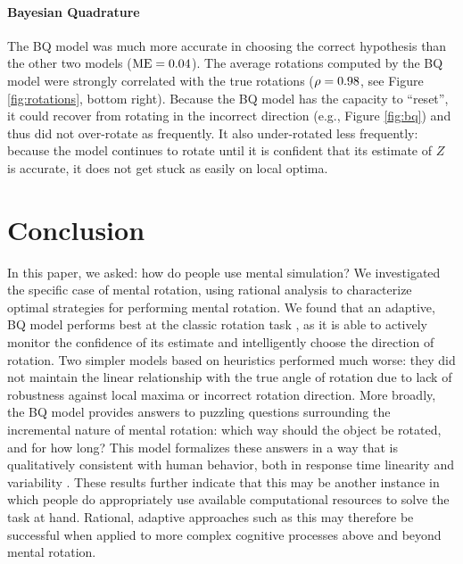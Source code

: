 \documentclass{article} %
\newcommand{\TODO}[1]{\textcolor{red}{[TODO: #1]}}
\begin{document}
\paragraph{Bayesian Quadrature}

The BQ model was much more accurate in choosing the correct hypothesis
than the other two models ($\mathrm{ME}{}=0.04{}$). The average rotations computed
by the BQ model were strongly correlated with the true rotations
($\rho=0.98$, see Figure \ref{fig:rotations}, bottom right). Because the
BQ model has the capacity to ``reset'', it could recover from rotating
in the incorrect direction (e.g., Figure \ref{fig:bq}) and thus did
not over-rotate as frequently.  It also under-rotated less frequently:
because the model continues to rotate until it is confident that its
estimate of $Z$ is accurate, it does not get stuck as easily on local
optima.


\section{Conclusion}

In this paper, we asked: how do people use mental simulation?  We
investigated the specific case of mental rotation, using rational
analysis to characterize optimal strategies for performing mental
rotation. We found that an adaptive, BQ model performs best at the
classic rotation task \cite{Shepard1971}, as it is able to actively
monitor the confidence of its estimate and intelligently choose the
direction of rotation. Two simpler models based on heuristics
performed much worse: they did not maintain the linear relationship
with the true angle of rotation due to lack of robustness against
local maxima or incorrect rotation direction.  More broadly, the BQ
model provides answers to puzzling questions surrounding the
incremental nature of mental rotation: which way should the object be
rotated, and for how long? This model formalizes these answers in a
way that is qualitatively consistent with human behavior, both in
response time linearity \cite{Shepard1971} and variability
\cite{Just1976}. These results further indicate that this may be
another instance in which people do appropriately use available
computational resources to solve the task at hand.  Rational, adaptive
approaches such as this may therefore be successful when applied to
more complex cognitive processes above and beyond mental rotation.





\renewcommand\refname{\normalsize{References}}

{\small }
\end{document}
